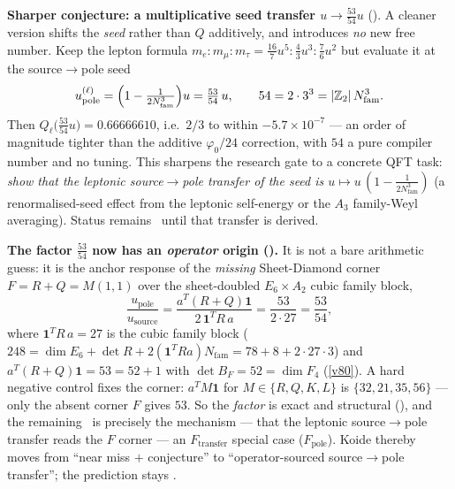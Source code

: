 \documentclass[11pt,a4paper]{article}
\newcommand{\Nfam}{N_{\mathrm{fam}}}
\newcommand{\Z}{\mathbb{Z}}
\begin{document}
\par\smallskip\noindent\textbf{Sharper conjecture: a multiplicative seed transfer $u\to\tfrac{53}{54}u$} (\mC).
A cleaner version shifts the \emph{seed} rather than $Q$ additively, and introduces \emph{no} new free
number. Keep the lepton formula $m_e{:}m_\mu{:}m_\tau=\tfrac{16}7u^5{:}\tfrac43u^3{:}\tfrac76u^2$ but
evaluate it at the source$\to$pole seed
\[
  u_{\mathrm{pole}}^{(\ell)}=\Bigl(1-\tfrac{1}{2\Nfam^3}\Bigr)u=\tfrac{53}{54}\,u,\qquad
  54=2\cdot3^3=|\Z_2|\,\Nfam^3 .
\]
Then $Q_\ell\bigl(\tfrac{53}{54}u\bigr)=0.66666610$, i.e.\ $2/3$ to within $-5.7\times10^{-7}$ ---
an order of magnitude tighter than the additive $\varphi_0/24$ correction, with $54$ a pure compiler
number and no tuning. This sharpens the research gate to a concrete QFT task: \emph{show that the
leptonic source$\to$pole transfer of the seed is $u\mapsto u\,(1-\tfrac{1}{2\Nfam^3})$} (a renormalised-seed
effect from the leptonic self-energy or the $A_3$ family-Weyl averaging). Status remains \mC\ until that
transfer is derived. 
\par\smallskip\noindent\textbf{The factor $\tfrac{53}{54}$ now has an \emph{operator} origin
().} It is not a bare arithmetic guess: it is the anchor
response of the \emph{missing} Sheet-Diamond corner $F=R+Q=M(1,1)$ over the sheet-doubled $E_6{\times}A_2$
cubic family block,
\[
  \frac{u_{\mathrm{pole}}}{u_{\mathrm{source}}}=\frac{a^T(R+Q)\mathbf1}{2\,\mathbf1^T R\,a}
  =\frac{53}{2\cdot27}=\frac{53}{54},
\]
where $\mathbf1^T R\,a=27$ is the cubic family block ($248=\dim E_6+\det R+2(\mathbf1^T R a)\Nfam
=78+8+2{\cdot}27{\cdot}3$) and $a^T(R+Q)\mathbf1=53=52+1$ with $\det B_F=52=\dim F_4$
(\vref{v80}). A hard negative control fixes the corner: $a^T M\mathbf1$ for $M\in\{R,Q,K,L\}$ is
$\{32,21,35,56\}$ --- only the absent corner $F$ gives $53$. So the \emph{factor} is exact and
structural (\mE), and the remaining \mC\ is precisely the mechanism --- that the leptonic
source$\to$pole transfer reads the $F$ corner --- an $F_{\mathrm{transfer}}$ special case
($F_{\mathrm{pole}}$). Koide thereby moves from ``near miss $+$ conjecture'' to
``operator-sourced source$\to$pole transfer''; the prediction stays \mC.
\end{document}
